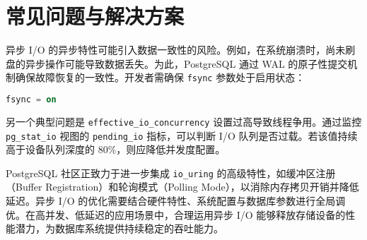 \chapter{常见问题与解决方案}
异步 I/O 的异步特性可能引入数据一致性的风险。例如，在系统崩溃时，尚未刷盘的异步操作可能导致数据丢失。为此，PostgreSQL 通过 WAL 的原子性提交机制确保故障恢复的一致性。开发者需确保 \verb!fsync! 参数处于启用状态：\par
\begin{lstlisting}[language=sql]
fsync = on
\end{lstlisting}
另一个典型问题是 \verb!effective_io_concurrency! 设置过高导致线程争用。通过监控 \verb!pg_stat_io! 视图的 \verb!pending_io! 指标，可以判断 I/O 队列是否过载。若该值持续高于设备队列深度的 80\%{}，则应降低并发度配置。\par
PostgreSQL 社区正致力于进一步集成 \verb!io_uring! 的高级特性，如缓冲区注册（Buffer Registration）和轮询模式（Polling Mode），以消除内存拷贝开销并降低延迟。异步 I/O 的优化需要结合硬件特性、系统配置与数据库参数进行全局调优。在高并发、低延迟的应用场景中，合理运用异步 I/O 能够释放存储设备的性能潜力，为数据库系统提供持续稳定的吞吐能力。\par
